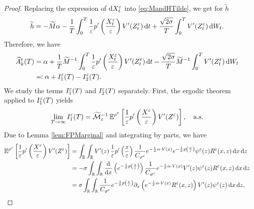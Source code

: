 \documentclass[10pt]{article}
\begin{document}
\begin{proof} Replacing the expression of $\mathrm{d} X^\varepsilon_t$ into \eqref{eq:MandHTilde}, we get for $\widetilde h$
\begin{equation}\label{Ahat_decomposition}
\widetilde h = -\widetilde M \alpha - \frac{1}{T} \int_0^T \frac{1}{\varepsilon} p' \left ( \frac{X^\varepsilon_t}{\varepsilon} \right ) V'(Z^\varepsilon_t) \,\mathrm{d} t + \frac{\sqrt{2\sigma}}{T} \int_0^T V'(Z^\varepsilon_t) \,\mathrm{d} W_t.
\end{equation}
Therefore, we have
\begin{equation}\label{eq:alphaDecomposition}
\begin{aligned}
	\widehat A^\varepsilon_k(T) &= \alpha + \frac{1}{T} \widetilde M^{-1} \int_0^T \frac{1}{\varepsilon} p' \left ( \frac{X^\varepsilon_t}{\varepsilon} \right ) V'(Z^\varepsilon_t) \,\mathrm{d} t - \frac{\sqrt{2\sigma}}{T}  \widetilde M^{-1} \int_0^T V'(Z^\varepsilon_t) \,\mathrm{d} W_t\\
	&\eqqcolon \alpha + I_1^\varepsilon(T) - I_2^\varepsilon(T).
\end{aligned}
\end{equation}
We study the terms $I_1^\varepsilon(T)$ and $I_2^\varepsilon(T)$ separately. First, the ergodic theorem applied to $I_1^\varepsilon(T)$ yields
\begin{equation}\label{limit_estimator}
\lim_{T \to \infty} I_1^\varepsilon(T) = \widetilde {\mathcal M}_\varepsilon^{-1} \operatorname{\mathbb{E}}^{\rho^\varepsilon} \left [ \frac{1}{\varepsilon} p' \left ( \frac{X^\varepsilon}{\varepsilon} \right ) V'(Z^\varepsilon) \right ], \quad \text{a.s.}
\end{equation}
Due to Lemma \ref{lem:FPMarginal} and integrating by parts, we have
\begin{equation}
\begin{aligned}
	\E^{\rho^\epl} \left [ \frac{1}{\epl} p' \left ( \frac{X^\epl}{\epl} \right ) V'(Z^\epl) \right ] &= \int_{\R} \int_{\R} V'(z) \, \frac1\epl p' \left ( \frac{x}\epl \right ) \frac{1}{C_{\phi^\epl}} e^{- \frac{1}{\sigma} \alpha \cdot V(x)} e^{ - \frac{1}{\sigma} p \left ( \frac{x}\epl \right)} \psi^\epl(z) R^\epl(x,z) \dd x \dd z \\
	&= -\sigma \int_{\R} \int_{\R} \frac{\d}{\d x}\left( e^{ - \frac{1}{\sigma} p \left ( \frac{x}\epl \right)} \right) \frac{1}{C_{\phi^\epl}} e^{- \frac{1}{\sigma} \alpha \cdot V(x)} V'(z) \psi^\epl(z) R^\epl(x,z) \dd x \dd z \\
	&= \sigma \int_{\R} \int_{\R} \frac{1}{C_{\phi^\epl}} e^{ - \frac{1}{\sigma} p \left ( \frac{x}\epl \right)} \partial_x \left ( e^{- \frac{1}{\sigma} \alpha \cdot V(x)} R^\epl(x,z) \right ) V'(z) \psi^\epl(z) \dd x \dd z,
\end{aligned}

\end{equation}
\end{proof}
\end{document}
